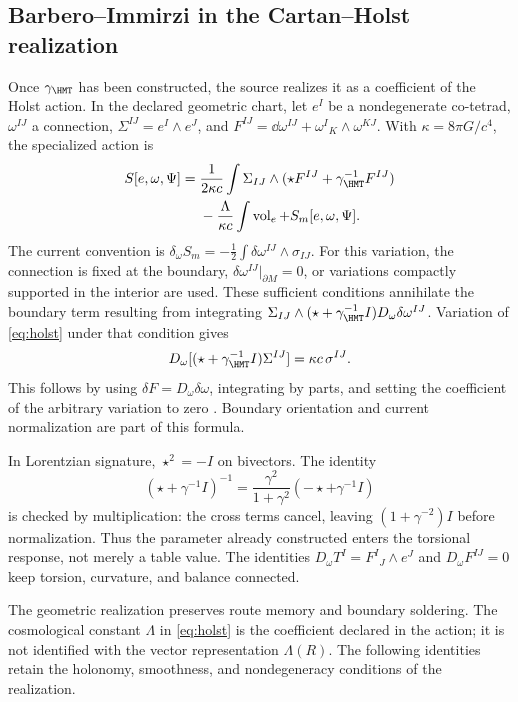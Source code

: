 \subsection{Barbero--Immirzi in the Cartan--Holst realization}
Once $\gamma_{\HMT}$ has been constructed, the source realizes it as a
coefficient of the Holst action. In the declared geometric chart,
let $e^I$ be a nondegenerate co-tetrad, $\omega^{IJ}$ a connection,
$\Sigma^{IJ}=e^I\wedge e^J$, and
$F^{IJ}=\dd\omega^{IJ}+\omega^I{}_K\wedge\omega^{KJ}$.
With $\kappa=8\pi G/c^4$, the specialized action is
\begin{equation}
\begin{aligned}
S[e,\omega,\Psi]
={}&\frac1{2\kappa c}\int
\Sigma_{IJ}\wedge(\star F^{IJ}+\gamma_{\HMT}^{-1}F^{IJ})\\
&-\frac{\Lambda}{\kappa c}\int\operatorname{vol}_e
+S_m[e,\omega,\Psi].
\end{aligned}
\label{eq:holst}
\end{equation}
The current convention is
$\delta_\omega S_m=-\tfrac12\int\delta\omega^{IJ}\wedge\sigma_{IJ}$.
For this variation, the connection is fixed at the boundary,
$\delta\omega^{IJ}|_{\partial M}=0$, or variations compactly
supported in the interior are used. These sufficient conditions annihilate
the boundary term resulting from integrating
$\Sigma_{IJ}\wedge(\star+\gamma_{\HMT}^{-1}I)
D_\omega\delta\omega^{IJ}$.
Variation of \eqref{eq:holst} under that condition gives
\[
D_\omega[(\star+\gamma_{\HMT}^{-1}I)\Sigma^{IJ}]
=\kappa c\,\sigma^{IJ}.
\]
This follows by using $\delta F=D_\omega\delta\omega$, integrating by parts,
and setting the coefficient of the arbitrary variation to zero
\cite{holst}. Boundary orientation and current
normalization are part of this formula.

In Lorentzian signature, $\star^2=-I$ on bivectors. The identity
\[
(\star+\gamma^{-1}I)^{-1}
=\frac{\gamma^2}{1+\gamma^2}(-\star+\gamma^{-1}I)
\]
is checked by multiplication: the cross terms
cancel, leaving $(1+\gamma^{-2})I$ before normalization.
Thus the parameter already constructed enters the torsional response,
not merely a table value.
The identities
$D_\omega T^I=F^I{}_J\wedge e^J$ and $D_\omega F^{IJ}=0$
keep torsion, curvature, and balance connected.

The geometric realization preserves route memory and boundary soldering.
The cosmological constant \(\Lambda\) in \eqref{eq:holst} is the
coefficient declared in the action; it is not identified with the vector
representation \(\Lambda(R)\). The following identities retain the
holonomy, smoothness, and nondegeneracy conditions of the realization.




